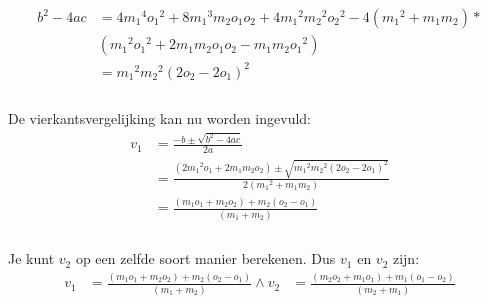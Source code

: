 \documentclass[12pt,a4paper]{article}
\begin{document}
	\begin{equation}
		\begin{aligned}
				b^2-4ac&=4{m_1}^4{o_1}^2+8{m_1}^3m_2o_1o_2+4{m_1}^2{m_2}^2{o_2}^2-4\left({m_1}^2+m_1m_2\right)*\\
			&\left({m_1}^2{o_1}^2+2m_1m_2o_1o_2-m_1m_2{o_1}^2\right)\\
			&={m_1}^2{m_2}^2{\left(2o_2-2o_1\right)}^2\\
		\end{aligned}
	\end{equation}
	\\De vierkantsvergelijking kan nu worden ingevuld:
	\begin{equation}
		\begin{aligned}
			v_1&=\frac{-b\pm\sqrt{b^2-4ac}}{2a}\\
			&=\frac{\left(2{m_1}^2o_1+2m_1m_2o_2\right)\pm\sqrt{{m_1}^2{m_2}^2{\left(2o_2-2o_1\right)}^2}}{2\left({m_1}^2+m_1m_2\right)}\\
			&=\frac{\left(m_1o_1+m_2o_2\right)+m_2\left(o_2-o_1\right)}{\left(m_1+m_2\right)}\\
		\end{aligned}
	\end{equation}
	\\Je kunt $v_2$ op een zelfde soort manier berekenen. Dus $v_1$ en $v_2$ zijn:
	\begin{equation}
		\begin{aligned}
		\label{uitwerking-energie-impuls}
			v_1&=\frac{\left(m_1o_1+m_2o_2\right)+m_2\left(o_2-o_1\right)}{\left(m_1+m_2\right)} \wedge v_2&=\frac{\left(m_2o_2+m_1o_1\right)+m_1\left(o_1-o_2\right)}{\left(m_2+m_1\right)}\\
		\end{aligned}
	\end{equation}
\end{document}
